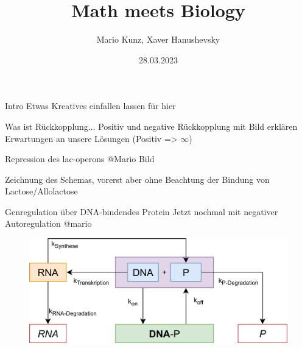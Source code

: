 \documentclass[11pt,aspectratio=169,reqno]{beamer}
\title{Math meets Biology}
\date[28.03.2023]{28.03.2023}
\author{Mario Kunz, Xaver Hanushevsky}
\institute{D-BIOL}
\begin{document}
\titleframe

\begin{frame}[fragile]{Intro}
    Etwas Kreatives einfallen lassen für hier
\end{frame}

\begin{frame}{Was ist Rückkopplung...}
Positiv und negative Rückkopplung mit Bild erklären
Erwartungen an unsere Lösungen (Positiv => $\infty$)
\end{frame}

\begin{frame}{Repression des lac-operons}
@Mario Bild

Zeichnung des Schemas, vorerst aber ohne Beachtung der Bindung von Lactose/Allolactose
\end{frame}

\begin{frame}{Genregulation über DNA-bindendes Protein}
    Jetzt nochmal mit negativer Autoregulation @mario

    \begin{figure}
        \centering
        \includegraphics[width=.6\textwidth]{images/negative_autoregulation_overview.png}
        \label{fig:my_label}
    \end{figure}
\end{frame}
\end{document}
